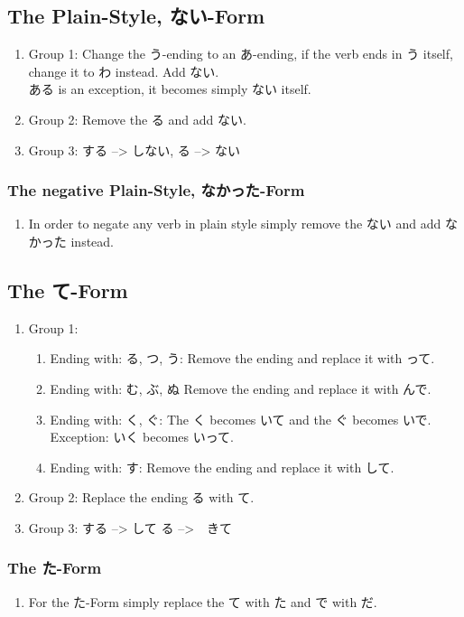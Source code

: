 \documentclass{article}
\newcommand\tab[1][1cm]{\hspace*{#1}}
\begin{document}
\subsection{The Plain-Style, ない-Form }
\begin{enumerate}
\item Group 1: Change the う-ending to an あ-ending, if the verb ends in う itself, 
change it to わ instead.
Add ない. \\ \tab ある is an exception, it becomes simply ない itself.
\item Group 2: Remove the る and add ない. 
\item Group 3: する --> しない,	 る --> ない
\end{enumerate}
\subsubsection{The negative Plain-Style, なかった-Form}
\begin{enumerate}
\item In order to negate any verb in plain style simply remove the ない and add なかった instead.
\end{enumerate}
\subsection{The て-Form}
\begin{enumerate} \item Group 1:
\begin{enumerate} \item Ending with: る, つ, う: Remove the ending and replace it with って.
\item Ending with: む, ぶ, ぬ Remove the ending and replace it with んで.
\item Ending with: く, ぐ: The く becomes いて and the ぐ becomes いで. Exception: いく becomes いって.
\item Ending with: す: Remove the ending and replace it with して.
\end{enumerate}
\item Group 2: Replace the ending る with て.
\item Group 3: する --> して	る -->　きて
\end{enumerate}
\subsubsection{The た-Form}
\begin{enumerate}
\item For the た-Form simply replace the て with た and で with だ.
\end{enumerate}
\end{document}
